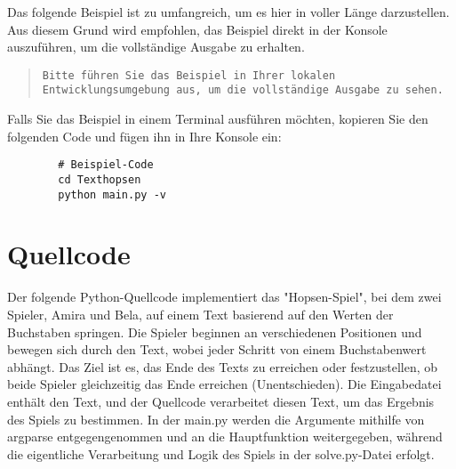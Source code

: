 \documentclass[a4paper,10pt,ngerman]{scrartcl}
\begin{document}
	Das folgende Beispiel ist zu umfangreich, um es hier in voller Länge darzustellen. Aus diesem Grund wird empfohlen, das Beispiel direkt in der Konsole auszuführen, um die vollständige Ausgabe zu erhalten.
	
	\begin{quote}
		\texttt{Bitte führen Sie das Beispiel in Ihrer lokalen Entwicklungsumgebung aus, um die vollständige Ausgabe zu sehen.}
	\end{quote}
	
	Falls Sie das Beispiel in einem Terminal ausführen möchten, kopieren Sie den folgenden Code und fügen ihn in Ihre Konsole ein:
	
	\begin{verbatim}
		# Beispiel-Code
		cd Texthopsen
		python main.py -v
	\end{verbatim}
	
	\section{Quellcode}
	
	Der folgende Python-Quellcode implementiert das "Hopsen-Spiel", bei dem zwei Spieler, Amira und Bela, auf einem Text basierend auf den Werten der Buchstaben springen. Die Spieler beginnen an verschiedenen Positionen und bewegen sich durch den Text, wobei jeder Schritt von einem Buchstabenwert abhängt. Das Ziel ist es, das Ende des Texts zu erreichen oder festzustellen, ob beide Spieler gleichzeitig das Ende erreichen (Unentschieden). Die Eingabedatei enthält den Text, und der Quellcode verarbeitet diesen Text, um das Ergebnis des Spiels zu bestimmen. In der main.py werden die Argumente mithilfe von argparse entgegengenommen und an die Hauptfunktion weitergegeben, während die eigentliche Verarbeitung und Logik des Spiels in der solve.py-Datei erfolgt.
	
\end{document}

